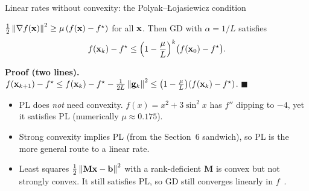 \begin{frame}{Linear rates without convexity: the Polyak--{\L}ojasiewicz condition}
  \begin{thmbox}
    $\tfrac12\left\lVert \nabla f(\mathbf{x}) \right\rVert^2\ge\mu\,(f(\mathbf{x})-f^\star)$ for all $\mathbf{x}$. Then GD with $\alpha = 1/L$ satisfies
    \[ f(\mathbf{x}_k)-f^\star\le\Bigl(1-\frac\mu L\Bigr)^k\bigl(f(\mathbf{x}_0)-f^\star\bigr). \]
  \end{thmbox}
  \small\textbf{Proof (two lines).}
  $f(\mathbf{x}_{k+1})-f^\star\le f(\mathbf{x}_k)-f^\star-\tfrac1{2L}\left\lVert \mathbf{g}_k \right\rVert^2\le\bigl(1-\tfrac\mu L\bigr)(f(\mathbf{x}_k)-f^\star)$. $\blacksquare$
  \begin{itemize}\small
    \item PL does \emph{not} need convexity. $f(x) = x^2+3\sin^2x$ has $f''$ dipping to $-4$,
          yet it satisfies PL (numerically $\mu\approx0.175$).
    \item Strong convexity implies PL (from the Section~6 sandwich), so PL is the more general route to a linear rate.
    \item Least squares $\tfrac12\left\lVert \mathbf M\mathbf{x}-\mathbf{b} \right\rVert^2$ with a rank-deficient $\mathbf M$ is convex but not strongly convex.
          It still satisfies PL, so GD still converges linearly in $f$~\cite{karimi2016}.
  \end{itemize}
\end{frame}

